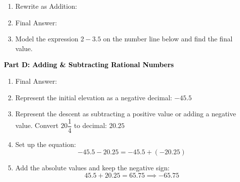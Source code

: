 \documentclass[12pt, letterpaper, fleqn]{article}
\newcommand{\blank}{\underline{\hspace{2.2cm}}}
\newcommand{\blanklong}{\underline{\hspace{6.5cm}}}
\begin{document}
\vspace{3mm}

\begin{enumerate}[itemsep=2.2cm, leftmargin=0.6cm, resume]
\item Rewrite as Addition: \blanklong
    \vspace{0.5cm}
\item Final Answer: \blank
\item Model the expression $2 - 3.5$ on the number line below and find the final value.
\vspace{5mm}
\begin{center}
\end{center}
\vspace{0.5cm}
\end{enumerate}

\newpage

\begin{tcolorbox}[colback=customteal!20]
\large\textcolor{black}{\textbf{Part D: Adding \& Subtracting Rational Numbers}}
\end{tcolorbox}

\vspace{3mm}

\begin{enumerate}[itemsep=2.2cm, leftmargin=0.6cm, resume]
\item Final Answer: \blank
\item Represent the initial elevation as a negative decimal: $-45.5$
\item Represent the descent as subtracting a positive value or adding a negative value. Convert $20\dfrac{1}{4}$ to decimal: $20.25$
\item Set up the equation:
    \[
    -45.5 - 20.25 = -45.5 + (-20.25)
    \]
\item Add the absolute values and keep the negative sign:
    \[
    45.5 + 20.25 = 65.75 \implies -65.75
    \]
\end{enumerate}
\end{document}
